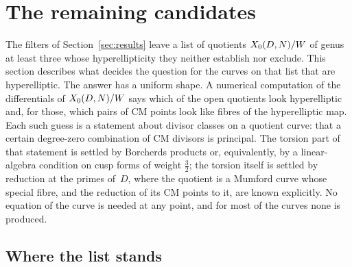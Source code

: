 
\section{The remaining candidates}\label{sec:candidates}

The filters of Section~\ref{sec:results} leave a list of quotients $X_0({D},{N})/W$ of genus at least three
whose hyperellipticity they neither establish nor exclude. This section describes what decides the question for
the curves on that list that are hyperelliptic. The answer has a uniform shape. A numerical computation of the
differentials of $X_0({D},{N})/W$ says which of the open quotients look hyperelliptic and, for those, which pairs
of CM points look like fibres of the hyperelliptic map. Each such guess is a statement about divisor classes on a
quotient curve: that a certain degree-zero combination of CM divisors is principal. The torsion part of that
statement is settled by Borcherds products or, equivalently, by a linear-algebra condition on cusp forms of
weight $\tfrac32$; the torsion itself is settled by reduction at the primes of~$D$, where the quotient is a
Mumford curve whose special fibre, and the reduction of its CM points to it, are known explicitly. No equation of
the curve is needed at any point, and for most of the curves none is produced.

\subsection{Where the list stands}\label{sec:candidates-list}


